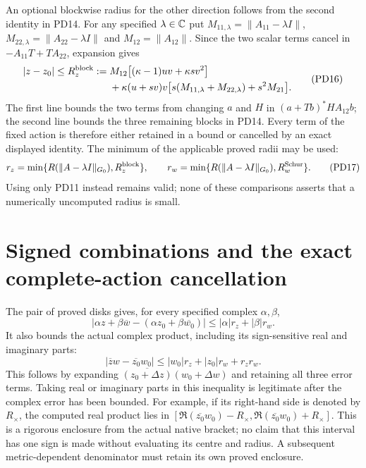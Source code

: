 \documentclass[11pt]{article}
\begin{document}
An optional blockwise radius for the other direction follows from
the second identity in PD14.  For any specified $\lambda\in\mathbb C$ put
$M_{11,\lambda}=\|A_{11}-\lambda I\|$,
$M_{22,\lambda}=\|A_{22}-\lambda I\|$ and
$M_{12}=\|A_{12}\|$.  Since the two scalar terms cancel in
$-A_{11}T+TA_{22}$, expansion gives
\[
 \begin{split}
 |z-z_0|\le R_z^{\rm block}:={}&
 M_{12}\bigl[(\kappa-1)uv+\kappa s v^2\bigr]\\
 &+\kappa(u+sv)v
       \bigl[s(M_{11,\lambda}+M_{22,\lambda})+s^2M_{21}\bigr].
 \end{split}                                                      \tag{PD16}
\]
The first line bounds the two terms from changing $a$ and $H$
in $(a+Tb)^*HA_{12}b$; the second line bounds the three remaining
blocks in PD14.  Every term of the fixed action is therefore
either retained in a bound or cancelled by an exact displayed
identity.  The minimum of the applicable proved radii may be used:
\[
 r_z=\min\{R(\|A-\lambda I\|_{G_0}),R_z^{\rm block}\},\qquad
 r_w=\min\{R(\|A-\lambda I\|_{G_0}),R_w^{\rm Schur}\}.          \tag{PD17}
\]
Using only PD11 instead remains valid; none of these comparisons
asserts that a numerically uncomputed radius is small.

\section{Signed combinations and the exact complete-action cancellation}
The pair of proved disks gives, for every specified complex
$\alpha,\beta$,
\[
 \left|\alpha z+\beta\overline w
         -(\alpha z_0+\beta\overline{w_0})\right|
                        \le|\alpha|r_z+|\beta|r_w.              \tag{PD18}
\]
It also bounds the actual complex product, including its sign-sensitive
real and imaginary parts:
\[
 \boxed{|\overline z w-\overline{z_0}w_0|
       \le |w_0|r_z+|z_0|r_w+r_zr_w.}                           \tag{PD19}
\]
This follows by expanding
$\overline{(z_0+\Delta z)}(w_0+\Delta w)$ and retaining all three
error terms.  Taking real or imaginary parts in this inequality
is legitimate after the complex error has been bounded.  For
example, if its right-hand side is denoted by $R_\times$, the
computed real product lies in
$[\Re(\overline{z_0}w_0)-R_\times,
\Re(\overline{z_0}w_0)+R_\times]$.
This is a rigorous enclosure from the actual native bracket; no
claim that this interval has one sign is made without evaluating
its centre and radius.  A subsequent metric-dependent denominator
must retain its own proved enclosure.
\end{document}
